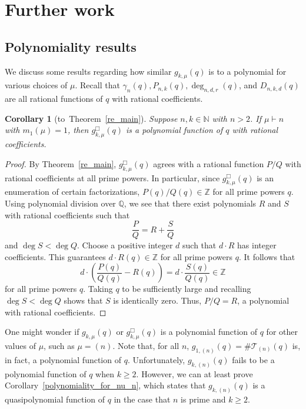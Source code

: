 \documentclass[10pt]{article}
\newtheorem{corollary}[theorem]{Corollary}
\theoremstyle{definition}
\newcommand{\N}{\mathbb{N}}
\newcommand{\Q}{\mathbb{Q}}
\newcommand{\CT}{\mathcal{T}}
\newcommand{\Z}{\mathbb{Z}}
\begin{document}
\section{Further work}
\label{outro}

\subsection{Polynomiality results}

We discuss some results regarding how similar \(g_{k,\mu}(q)\) is to a polynomial for various choices of \(\mu\).
Recall that \(\gamma_n (q), P_{n,k} (q), \deg_{n,d,r} (q)\), and \(D_{n,k,d} (q)\) are all rational functions of \(q\) with rational coefficients.

\begin{corollary}[to~Theorem~\ref{re_main}]
\label{full_polynomiality_for_some}
Suppose \(n, k \in \N\) with \(n > 2\).
If \(\mu \vdash n\) with \(m_1(\mu) = 1\), then \(g_{k,\mu}^\Box (q)\) is a polynomial function of \(q\) with rational coefficients.
\end{corollary}

\begin{proof}
By Theorem~\ref{re_main}, \(g^\Box_{k,\mu} (q)\) agrees with a rational function \(P / Q\) with rational coefficients at all prime powers.
In particular, since \(g^\Box_{k,\mu} (q)\) is an enumeration of certain factorizations, \(P(q) / Q(q) \in \Z\) for all prime powers \(q\).
Using polynomial division over \(\Q\),
we see that there exist polynomials \(R\) and \(S\) with rational coefficients such that
\begin{equation}
	\label{rational_fractional_etc}
	\frac{P}{Q} = R + \frac{S}{Q}
\end{equation}
and \(\deg S < \deg Q\).
Choose a positive integer \(d\) such that \(d \cdot R\) has integer coefficients.
This guarantees \(d \cdot R(q) \in \Z\) for all prime powers \(q\).
It follows that
\begin{equation}
	d \cdot \left ( \frac{P(q)}{Q(q)} - R(q) \right ) = d \cdot \frac{S(q)}{Q(q)} \in \Z
\end{equation}
for all prime powers \(q\).
Taking \(q\) to be sufficiently large and recalling \(\deg S < \deg Q\) shows that \(S\) is identically zero.
Thus, \(P/Q = R\), a polynomial with rational coefficients.
\end{proof}

One might wonder if \(g_{k,\mu} (q)\) or \(g^\Box_{k,\mu} (q)\) is a polynomial function of \(q\) for other values of \(\mu\), such as \(\mu = (n)\).
Note that, for all \(n\), \(g_{1,(n)} (q) = \# \CT_{(n)} (q)\) is, in fact, a polynomial function of \(q\).
Unfortunately, \(g_{k,(n)}(q)\) fails to be a polynomial function of \(q\) when \(k \geq 2\).
However, we can at least prove Corollary~\ref{polynomiality_for_nu_n}, which states that \(g_{k,(n)} (q)\) is a quasipolynomial function of \(q\) in the case that \(n\) is prime and \(k \geq 2\).
\end{document}
